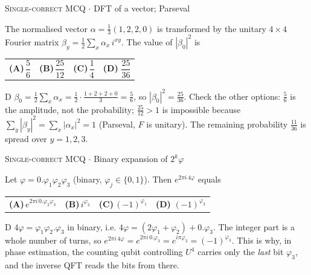 \documentclass[11pt,a4paper]{article}
\newcommand{\optlabel}[1]{\textbf{(#1)}}
\newcommand{\correctlabel}[1]{\textcolor{okgreen}{\textbf{(#1)}\,\ding{51}}}
\newenvironment{qitem}[1]{\begin{list}{}{\setlength{\leftmargin}{3.3em}\setlength{\labelwidth}{3.1em}%
  \setlength{\labelsep}{0.2em}\setlength{\topsep}{3pt}\setlength{\parsep}{3pt}}\item[\textbf{Q.#1}\hfill]}{\end{list}}
\newcommand{\qsep}{\par\vspace{2pt}{\color{black!15}\hrule}\vspace{4pt}}
\newcommand{\qmeta}[2]{{\footnotesize\color{black!60}\textsc{#1} \;$\cdot$\; #2}\par}
\begin{document}
\begin{qitem}{13}
\qmeta{Single-correct MCQ}{DFT of a vector; Parseval}
The normalised vector $\alpha = \frac13(1, 2, 2, 0)$ is transformed by the unitary $4\times4$ Fourier matrix
$\beta_y = \frac12\sum_{x}\alpha_x\, i^{xy}$. The value of $|\beta_0|^2$ is
\par\smallskip\noindent\begin{tabularx}{\linewidth}{@{}*{4}{L}@{}}
\optlabel{A}\,$\dfrac56$ & \optlabel{B}\,$\dfrac{25}{12}$ & \optlabel{C}\,$\dfrac14$ & \correctlabel{D}\,$\dfrac{25}{36}$
\end{tabularx}
\end{qitem}
\begin{solbox}{D}
$\beta_0 = \frac12\sum_x \alpha_x = \frac12\cdot\frac{1+2+2+0}{3} = \frac56$, so $|\beta_0|^2 = \frac{25}{36}$.
Check the other options: $\frac56$ is the amplitude, not the probability; $\frac{25}{12} > 1$ is impossible because
$\sum_y|\beta_y|^2 = \sum_x|\alpha_x|^2 = 1$ (Parseval, $F$ is unitary). The remaining probability $\frac{11}{36}$ is spread over $y = 1,2,3$.
\end{solbox}
\qsep

\begin{qitem}{14}
\qmeta{Single-correct MCQ}{Binary expansion of $2^k\varphi$}
Let $\varphi = 0.\varphi_1\varphi_2\varphi_3$ (binary, $\varphi_j \in \{0,1\}$). Then $e^{2\pi i\,4\varphi}$ equals
\par\smallskip\noindent\begin{tabularx}{\linewidth}{@{}*{4}{L}@{}}
\optlabel{A}\,$e^{2\pi i\,0.\varphi_2\varphi_3}$ & \optlabel{B}\,$i^{\varphi_2}$ & \optlabel{C}\,$(-1)^{\varphi_1}$ & \correctlabel{D}\,$(-1)^{\varphi_3}$
\end{tabularx}
\end{qitem}
\begin{solbox}{D}
$4\varphi = \varphi_1\varphi_2.\varphi_3$ in binary, i.e. $4\varphi = (2\varphi_1 + \varphi_2) + 0.\varphi_3$. The integer part is a
whole number of turns, so $e^{2\pi i\,4\varphi} = e^{2\pi i\,0.\varphi_3} = e^{i\pi\varphi_3} = (-1)^{\varphi_3}$.
This is why, in phase estimation, the counting qubit controlling $U^{4}$ carries only the \emph{last} bit $\varphi_3$, and the
inverse QFT reads the bits from there.
\end{solbox}
\qsep
\end{document}
